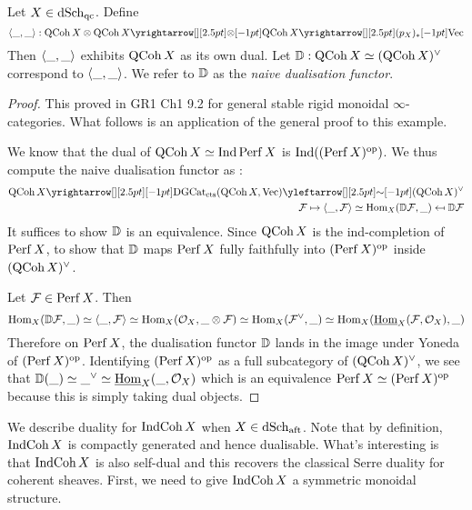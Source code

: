 \documentclass[./main.tex]{subfiles}
\begin{document}
\begin{prop}

  Let $X \in \mathrm{dSch}_\mathrm{qc}$.
  Define \[
    \<\_,\_\> : 
    \QCOH\,X \otimes \QCOH\,X \map{\otimes}{} \QCOH\,X \map{(p_X)_*}{} \VEC
  \]
  Then $\langle\_,\_\rangle$ exhibits $\mathrm{QCoh}\,X$ as its own dual.
  Let $\mathbb{D} : \mathrm{QCoh}\,X \simeq (\mathrm{QCoh}\,X)^\vee$ correspond to $\langle\_,\_\rangle$.
  We refer to $\mathbb{D}$ as the \emph{naive dualisation functor}.

\end{prop}
\begin{proof}
  This proved in GR1 Ch1 9.2 for general 
  stable rigid monoidal $\infty$-categories.
  What follows is an application of the general proof to this example.
  
  We know that the dual of $\mathrm{QCoh}\,X \simeq \mathrm{Ind}\,\mathrm{Perf}\,X$
  is $\mathrm{Ind}((\mathrm{Perf}\,X)^{\mathrm{op}})$.
  We thus compute the naive dualisation functor as : 
  \begin{align*}
    \QCOH\,X \map{}{} 
    \DGCAT_\CTS(\QCOH\,X , \VEC) \mapfrom{\sim}{}
    (\QCOH\,X)^\vee \\
    \FF \mapsto 
    \<\_ , \FF \> \simeq \HOM_X(\D \FF , \_)
    \mapsfrom \D \FF
  \end{align*}
  It suffices to show $\mathbb{D}$ is an equivalence.
  Since $\mathrm{QCoh}\,X$ is the ind-completion of $\mathrm{Perf}\,X$,
   to show that
  $\mathbb{D}$ maps $\mathrm{Perf}\,X$ fully faithfully into 
  $(\mathrm{Perf}\,X)^{\mathrm{op}}$ inside $(\mathrm{QCoh}\,X)^\vee$.

  Let $\mathcal{F} \in \mathrm{Perf}\,X$.
  Then \[
    \mathrm{Hom}_X(\mathbb{D} \mathcal{F} , \_) \simeq 
    \langle\_ , \mathcal{F}\rangle \simeq
    \mathrm{Hom}_X(\mathcal{O}_X , \_ \otimes \mathcal{F}) \simeq
    \mathrm{Hom}_X(\mathcal{F}^\vee , \_) \simeq
    \mathrm{Hom}_X(\underline{\mathrm{Hom}}_X(\mathcal{F} , \mathcal{O}_X) , \_)
  \]
  Therefore on $\mathrm{Perf}\,X$, 
  the dualisation functor 
  $\mathbb{D}$ lands in the image under Yoneda of $(\mathrm{Perf}\,X)^{\mathrm{op}}$.
  Identifying $(\mathrm{Perf}\,X)^{\mathrm{op}}$ as a full subcategory of $(\mathrm{QCoh}\,X)^\vee$,
  we see that $\mathbb{D}(\_) \simeq \_^\vee \simeq \underline{\mathrm{Hom}}_X(\_ , \mathcal{O}_X)$
  which is an equivalence $\mathrm{Perf}\,X \simeq (\mathrm{Perf}\,X)^{\mathrm{op}}$
  because this is simply taking dual objects.

\end{proof}

We describe duality for $\mathrm{IndCoh}\,X$ when $X \in \mathrm{dSch}_{\mathrm{aft}}$.
Note that by definition, $\mathrm{IndCoh}\,X$ is compactly generated
and hence dualisable.
What's interesting is that $\mathrm{IndCoh}\,X$ is also self-dual
and this recovers the classical Serre duality for coherent sheaves.
First, we need to give $\mathrm{IndCoh}\,X$ a symmetric monoidal structure.
\end{document}
